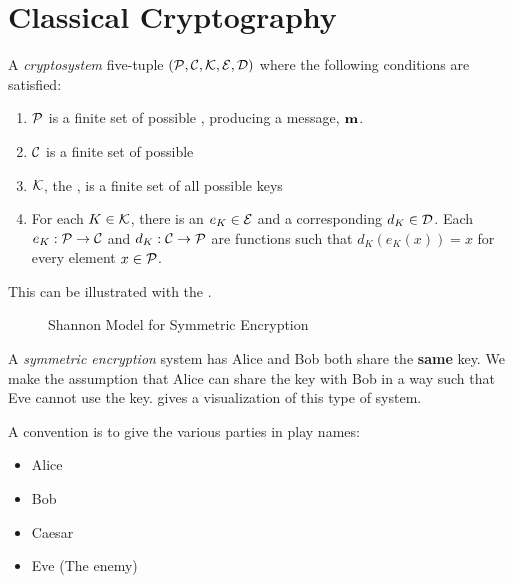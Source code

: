 \section{Classical Cryptography}\label{sec:Classical_Cryptography}
\begin{definition}[Cryptosystem]\label{def:Cryptosystem}
  A \emph{cryptosystem} five-tuple $(\operatorname{\mathcal{P}}, \operatorname{\mathcal{C}}, \operatorname{\mathcal{K}}, \operatorname{\mathcal{E}}, \operatorname{\mathcal{D}})$ where the following conditions are satisfied:
  \begin{enumerate}[noitemsep]
  \item $\operatorname{\mathcal{P}}$ is a finite set of possible \emph{}, producing a message, $\operatorname{\mathbf{m}}$.
  \item $\operatorname{\mathcal{C}}$ is a finite set of possible \emph{}
  \item $\operatorname{\mathcal{K}}$, the \emph{}, is a finite set of all possible keys
  \item For each $K \in \operatorname{\mathcal{K}}$, there is an \emph{} $e_{K}\in \operatorname{\mathcal{E}}$ and a corresponding \emph{} $d_{K} \in \operatorname{\mathcal{D}}$.
    Each $e_{K} : \operatorname{\mathcal{P}} \to \operatorname{\mathcal{C}}$ and $d_{K} : \operatorname{\mathcal{C}} \to \operatorname{\mathcal{P}}$ are functions such that $d_{K} \left( e_{K}(x) \right) = x$ for every  element $x \in \operatorname{\mathcal{P}}$.
  \end{enumerate}
\end{definition}

This can be illustrated with the .

\begin{figure}[h!]
  \centering
  \caption{Shannon Model for Symmetric Encryption}
  \label{fig:Shannon_Model_Symmetric_Encryption}
\end{figure}

\begin{definition}\label{def:Symmetric_Encryption}
  A \emph{symmetric encryption} system has Alice and Bob both share the \textbf{same} key.
  We make the assumption that Alice can share the key with Bob in a way such that Eve cannot use the key.
   gives a visualization of this type of system.
\end{definition}

A convention is to give the various parties in play names:
\begin{itemize}[noitemsep]
\item Alice
\item Bob
\item Caesar
\item Eve (The enemy)
\end{itemize}

